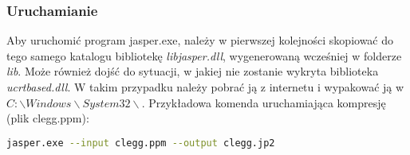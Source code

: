 \subsubsection{Uruchamianie}

Aby uruchomić program jasper.exe, należy w pierwszej kolejności skopiować do tego samego katalogu bibliotekę \textit{libjasper.dll}, wygenerowaną wcześniej w folderze \textit{lib}. Może również dojść do sytuacji, w jakiej nie zostanie wykryta biblioteka \textit{ucrtbased.dll}. W takim przypadku należy pobrać ją z internetu i wypakować ją w \textit{$C:\backslash Windows\backslash System32\backslash$}. Przykładowa komenda uruchamiająca kompresję (plik clegg.ppm):

\begin{lstlisting}[language=bash]
jasper.exe --input clegg.ppm --output clegg.jp2
\end{lstlisting}